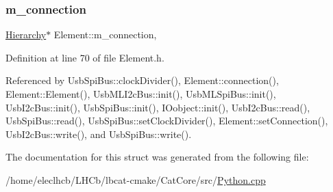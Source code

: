 \subsubsection{\texorpdfstring{m\+\_\+connection}{m\_connection}}
{\footnotesize\ttfamily \hyperlink{classHierarchy}{Hierarchy}$\ast$ Element\+::m\+\_\+connection\hspace{0.3cm}{\ttfamily [protected]}, {\ttfamily [inherited]}}



Definition at line 70 of file Element.\+h.



Referenced by Usb\+Spi\+Bus\+::clock\+Divider(), Element\+::connection(), Element\+::\+Element(), Usb\+M\+L\+I2c\+Bus\+::init(), Usb\+M\+L\+Spi\+Bus\+::init(), Usb\+I2c\+Bus\+::init(), Usb\+Spi\+Bus\+::init(), I\+Oobject\+::init(), Usb\+I2c\+Bus\+::read(), Usb\+Spi\+Bus\+::read(), Usb\+Spi\+Bus\+::set\+Clock\+Divider(), Element\+::set\+Connection(), Usb\+I2c\+Bus\+::write(), and Usb\+Spi\+Bus\+::write().



The documentation for this struct was generated from the following file\+:\begin{DoxyCompactItemize}
\item 
/home/eleclhcb/\+L\+H\+Cb/lbcat-\/cmake/\+Cat\+Core/src/\hyperlink{CatCore_2src_2Python_8cpp}{Python.\+cpp}\end{DoxyCompactItemize}

